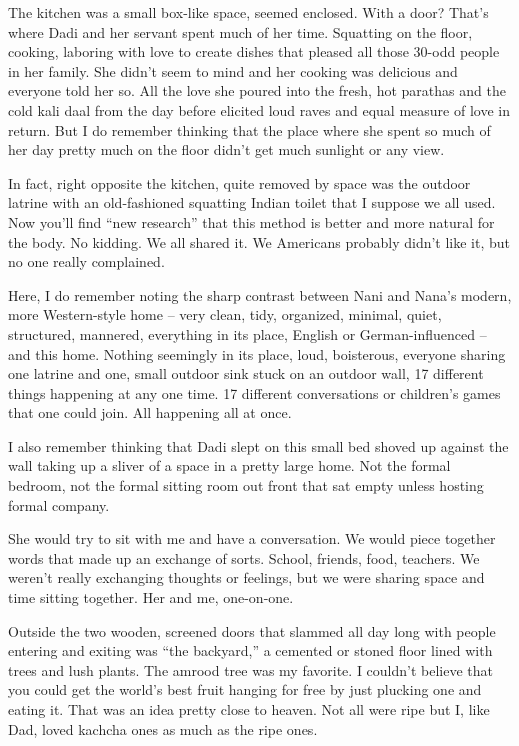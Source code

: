 The kitchen was a small box-like space, seemed enclosed. With a door? That’s where Dadi and her servant spent much of her time. Squatting on the floor, cooking, laboring with love to create dishes that pleased all those 30-odd people in her family. She didn’t seem to mind and her cooking was delicious and everyone told her so. All the love she poured into the fresh, hot parathas and the cold kali daal from the day before elicited loud raves and equal measure of love in return. But I do remember thinking that the place where she spent so much of her day pretty much on the floor didn't get much sunlight or any view.

In fact, right opposite the kitchen, quite removed by space was the outdoor latrine with an old-fashioned squatting Indian toilet that I suppose we all used. Now you’ll find “new research” that this method is better and more natural for the body. No kidding. We all shared it. We Americans probably didn’t like it, but no one really complained.

Here, I do remember noting the sharp contrast between Nani and Nana’s modern, more Western-style home – very clean, tidy, organized, minimal, quiet, structured, mannered, everything in its place, English or German-influenced – and this home. Nothing seemingly in its place, loud, boisterous, everyone sharing one latrine and one, small outdoor sink stuck on an outdoor wall, 17 different things happening at any one time. 17 different conversations or children’s games that one could join. All happening all at once.

I also remember thinking that Dadi slept on this small bed shoved up against the wall taking up a sliver of a space in a pretty large home. Not the formal bedroom, not the formal sitting room out front that sat empty unless hosting formal company.

She would try to sit with me and have a conversation. We would piece together words that made up an exchange of sorts. School, friends, food, teachers. We weren’t really exchanging thoughts or feelings, but we were sharing space and time sitting together. Her and me, one-on-one.

Outside the two wooden, screened doors that slammed all day long with people entering and exiting was “the backyard,” a cemented or stoned floor lined with trees and lush plants. The amrood tree was my favorite. I couldn’t believe that you could get the world’s best fruit hanging for free by just plucking one and eating it. That was an idea pretty close to heaven. Not all were ripe but I, like Dad, loved kachcha ones as much as the ripe ones.


